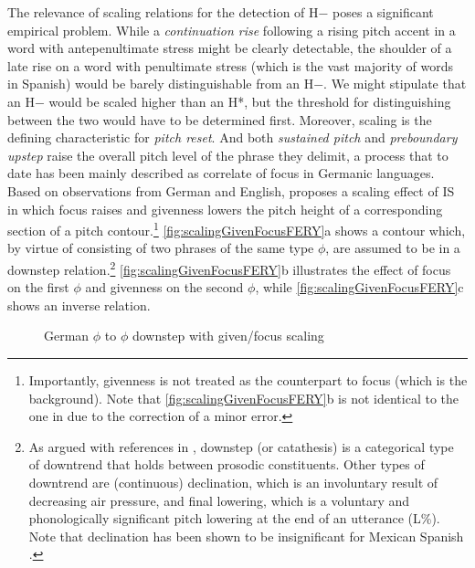 The relevance of scaling relations for the detection of H$-$ 
poses a significant empirical problem. While a \textit{continuation rise} following a rising pitch accent in a word with antepenultimate stress might be clearly 
detectable, the shoulder of a late rise on a word with penultimate stress 
(which is the vast majority of words in Spanish) would be barely 
distinguishable from an H$-$. We might stipulate that an H$-$ would be 
scaled higher than an H*, but the threshold for distinguishing between the two 
would have to be determined first. Moreover, scaling is the defining 
characteristic for \textit{pitch reset}. And both \textit{sustained pitch} and \textit{preboundary upstep} raise the overall pitch level of the phrase they delimit, a process that to date has been mainly described as correlate of focus in Germanic languages. Based on observations from German and English, \citet[154]{Fery.2017} proposes a scaling effect of \ac{IS} in which focus raises and givenness lowers the pitch height of a corresponding section of a pitch contour.\footnote{Importantly, givenness is not treated as the counterpart to focus (which is the background). Note 
that \autoref{fig:scalingGivenFocusFERY}b is not identical to the one in \citet[154]{Fery.2017} due to the correction of a minor error.} \autoref{fig:scalingGivenFocusFERY}a shows a contour which, by virtue of consisting of two phrases of the same type $\phi$, are assumed to be in a downstep 
relation.\footnote{As argued with references in \citet[107--113]{Fery.2017}, downstep (or catathesis) is a categorical type of downtrend that holds between prosodic constituents. Other types of downtrend are (continuous) declination, which is an involuntary result of decreasing air pressure, and final lowering, which is a voluntary and phonologically significant pitch lowering at the end of an utterance (L\%). Note that declination has been shown to be insignificant for Mexican Spanish \citep{PrietoShihNibert.1996}.} \autoref{fig:scalingGivenFocusFERY}b illustrates the effect of 
focus on the first $\phi$ and givenness on the second $\phi$, while \autoref{fig:scalingGivenFocusFERY}c shows an inverse relation.\largerpage

\begin{figure}
\bigskip
\caption[Downstep relation $\phi$ to $\phi$ in German]{German $\phi$ to 
$\phi$ downstep with given/focus scaling 
\citep[154]{Fery.2017}}\label{fig:scalingGivenFocusFERY}
\end{figure}

